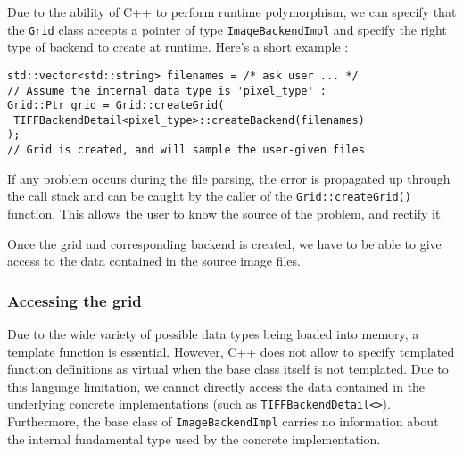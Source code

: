 {{{			\myparspace

			Due to the ability of C++ to perform runtime polymorphism, we can specify that the \texttt{Grid} class accepts a pointer of type \texttt{ImageBackendImpl} and specify the right type of backend to create at runtime. Here's a short example :

\begin{lstlisting}[style=cppbasicstyle, caption={Creating a grid}]
std::vector<std::string> filenames = /* ask user ... */ 
// Assume the internal data type is 'pixel_type' :
Grid::Ptr grid = Grid::createGrid(
 TIFFBackendDetail<pixel_type>::createBackend(filenames)
);
// Grid is created, and will sample the user-given files
\end{lstlisting}

			If any problem occurs during the file parsing, the error is propagated up through the call stack and can be caught by the caller of the \texttt{Grid::createGrid()} function. This allows the user to know the source of the problem, and rectify it.
		}
		\myparspace

		Once the grid and corresponding backend is created, we have to be able to give access to the data contained in the source image files.

		\subsubsection{Accessing the grid}
		{
			Due to the wide variety of possible data types being loaded into memory, a template function is essential. However, C++ does not allow to specify templated function definitions as virtual when the base class itself is not templated. Due to this language limitation, we cannot directly access the data contained in the underlying concrete implementations (such as \texttt{TIFFBackendDetail<>}). Furthermore, the base class of \texttt{ImageBackendImpl} carries no information about the internal fundamental type used by the concrete implementation.\par

}}}
